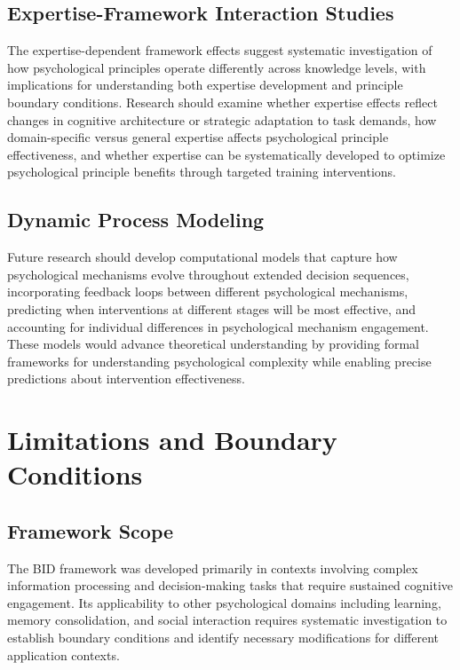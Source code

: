 \documentclass[
  authoryear,
  preprint]{elsarticle}
\begin{document}
\subsection{Expertise-Framework Interaction
Studies}\label{expertise-framework-interaction-studies}

The expertise-dependent framework effects suggest systematic
investigation of how psychological principles operate differently across
knowledge levels, with implications for understanding both expertise
development and principle boundary conditions. Research should examine
whether expertise effects reflect changes in cognitive architecture or
strategic adaptation to task demands, how domain-specific versus general
expertise affects psychological principle effectiveness, and whether
expertise can be systematically developed to optimize psychological
principle benefits through targeted training interventions.

\subsection{Dynamic Process Modeling}\label{dynamic-process-modeling}

Future research should develop computational models that capture how
psychological mechanisms evolve throughout extended decision sequences,
incorporating feedback loops between different psychological mechanisms,
predicting when interventions at different stages will be most
effective, and accounting for individual differences in psychological
mechanism engagement. These models would advance theoretical
understanding by providing formal frameworks for understanding
psychological complexity while enabling precise predictions about
intervention effectiveness.

\section{Limitations and Boundary
Conditions}\label{limitations-and-boundary-conditions}

\subsection{Framework Scope}\label{framework-scope}

The BID framework was developed primarily in contexts involving complex
information processing and decision-making tasks that require sustained
cognitive engagement. Its applicability to other psychological domains
including learning, memory consolidation, and social interaction
requires systematic investigation to establish boundary conditions and
identify necessary modifications for different application contexts.
\end{document}
